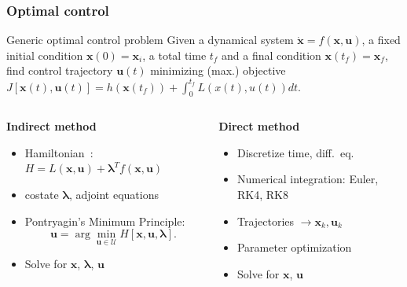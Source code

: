 \documentclass{beamer}
\begin{document}
\begin{frame}
    \frametitle{Optimal control}\pause
    \begin{block}{Generic optimal control problem}
        Given a dynamical system \(\dot{\mathbf{x}} = f(\mathbf{x}, \mathbf{u})\), a fixed initial condition \(\mathbf{x}(0) = \mathbf{x}_i\), a total time \(t_f\) and a final condition \(\mathbf{x}(t_f) = \mathbf{x}_f\), find control trajectory \(\mathbf{u}(t)\) minimizing (max.) objective \(J[\mathbf{x}(t), \mathbf{u}(t)] = h(\mathbf{x}(t_f))+\int_0^{t_f} L(x(t), u(t)) dt\).
    \end{block}\pause
    \begin{columns}
        \begin{column}{0.5\linewidth}
            \begin{center}
                \textbf{Indirect method}
            \end{center}\pause
            \begin{itemize}
                \item Hamiltonian~\cite{bertsekas}: \(H = L(\mathbf{x}, \mathbf{u}) + \mathbf{\lambda}^T f(\mathbf{x}, \mathbf{u})\)\pause
                \item costate \(\mathbf{\lambda}\), adjoint equations\pause
                \item Pontryagin's Minimum Principle:
                \begin{equation}
                    \mathbf{u} = \arg \min_{\mathbf{u} \in \mathcal{U}} H[\mathbf{x}, \mathbf{u}, \mathbf{\lambda}].
                \end{equation}\pause
                \item Solve for \(\mathbf{x}\), \(\mathbf{\lambda}\), \(\mathbf{u}\)\pause
            \end{itemize}
        \end{column}
        \begin{column}{0.5\linewidth}\pause
            \begin{center}
                \textbf{Direct method}
            \end{center}\pause
            \begin{itemize}
                \item Discretize time, diff.\ eq.\pause
                \item Numerical integration: Euler, RK4, RK8\pause
                \item Trajectories \(\rightarrow \mathbf{x}_k, \mathbf{u}_k\)\pause
                \item Parameter optimization\pause
                \item Solve for \(\mathbf{x}\), \(\mathbf{u}\)\pause
            \end{itemize}
        \end{column}
    \end{columns}
\end{frame}
\end{document}
